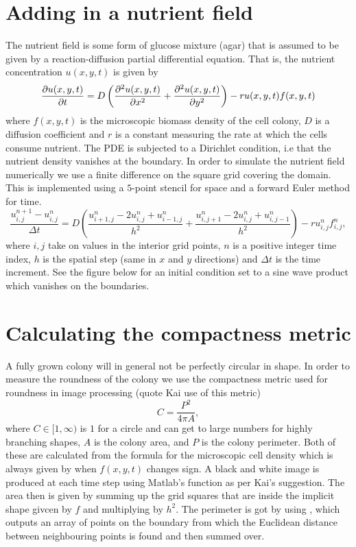 \section{Adding in a nutrient field}
The nutrient field is some form of glucose mixture (agar) that is assumed to be given by a reaction-diffusion 
partial differential equation. That is, the nutrient concentration $u(x,y,t)$ is given by
\begin{equation}
    \pdv{u(x,y,t)}{t} = D \left( \frac{\partial^2 u(x,y,t)}{\partial x^2} + 
                          \frac{\partial^2 u(x,y,t)}{\partial y^2} \right) - r u(x,y,t) f(x,y,t)
\end{equation}
where $f(x,y,t)$ is the microscopic biomass density of the cell colony, $D$ is a diffusion
coefficient and $r$ is a constant measuring the rate at which the cells consume nutrient.
The PDE is subjected to a Dirichlet condition, i.e
that the nutrient density vanishes at the boundary. In order to simulate the nutrient field
numerically we use a finite difference on the square grid covering the domain. This is implemented 
using a $5$-point stencil for space and a forward Euler method for time.
\begin{equation}
    \frac{u_{i,j}^{n+1} - u_{i,j}^n}{\Delta t} = 
    D \left( \frac{u_{i+1,j}^{n} - 2 u_{i,j}^n +u_{i-1,j}^n}{h^2} +
             \frac{u_{i,j+1}^{n} - 2 u_{i,j}^n +u_{i,j-1}^n}{h^2} \right)-
             r u_{i,j}^n f_{i,j}^n,
\end{equation}
where $i,j$ take on values in the interior grid points, $n$ is a positive integer time index, 
$h$ is the spatial step (same in $x$ and $y$ directions) and $\Delta t$ is the time increment. See the
figure below for an initial condition set to a sine wave product which vanishes on the boundaries.




\section{Calculating the compactness metric}
A fully grown colony will in general not be perfectly circular in shape.
 In order to measure the roundness of the colony we use the compactness metric used for 
 roundness in image processing (quote Kai use of this metric)
\begin{equation}
  C = \frac{P^2}{4 \pi A},
\end{equation}
where $C \in [1, \infty)$ is $1$ for a circle and can get to large numbers for 
highly branching shapes, $A$ is the colony area, and $P$ is the colony perimeter. 
Both of these are calculated from the formula for the microscopic cell
density which is always given by when $f(x,y,t)$ changes sign. A black and white image 
is produced at each time step using Matlab's function  as per
Kai's suggestion. The area then is given by summing up the grid squares that are
inside the implicit shape givcen by $f$ and multiplying by $h^2$. The perimeter
is got by using , which outputs an array of points on the boundary
from which the Euclidean distance between neighbouring points is found and then summed over.

